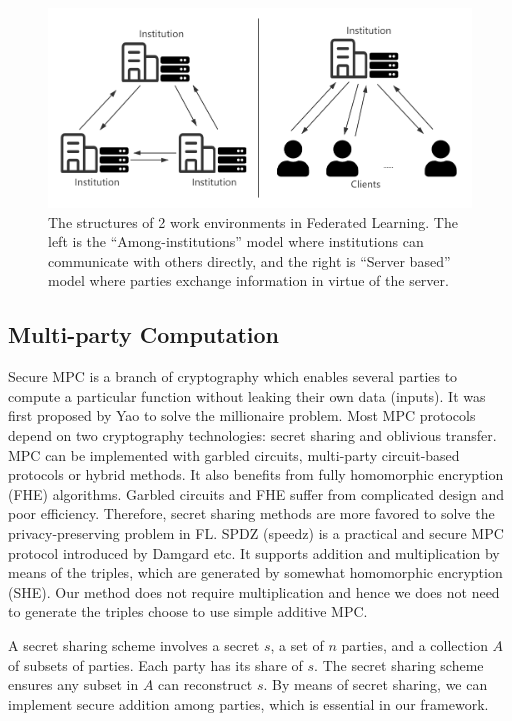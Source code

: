 \begin{figure}[!ht]
    \centering
    \includegraphics[width=\columnwidth]{img/fl_model.png}
    \caption{The structures of 2 work environments in Federated Learning. The left is the ``Among-institutions'' model where institutions can communicate with others directly, and the right is ``Server based'' model where parties exchange information in virtue of the server.}
    \label{fl_model}
\end{figure}


\subsection{Multi-party Computation}
Secure MPC is a branch of cryptography which enables several parties to compute a particular function without leaking their own data (inputs). It was first proposed by Yao to solve the millionaire problem\cite{Yao}. Most MPC protocols depend on two cryptography technologies: secret sharing\cite{Shamir} and oblivious transfer\cite{OT}. MPC can be implemented with garbled circuits, multi-party circuit-based protocols or hybrid methods\cite{mpc-sok}. It also benefits from fully homomorphic encryption (FHE) algorithms. Garbled circuits and FHE suffer from complicated design and poor efficiency. Therefore, secret sharing methods are more favored to solve the privacy-preserving problem in FL. SPDZ\cite{SPDZ} (speedz) is a practical and secure MPC protocol introduced by Damgard etc. It supports addition and multiplication by means of the triples\cite{Triple}, which are generated by somewhat homomorphic encryption (SHE). Our method does not require multiplication and hence we does not need to generate the triples choose to use simple additive MPC.

A secret sharing scheme involves a secret $s$, a set of $n$ parties, and a collection $A$ of subsets of parties. Each party has its share of $s$. The secret sharing scheme ensures any subset in $A$ can reconstruct $s$\cite{Secret-Sharing-survey}. By means of secret sharing, we can implement secure addition among parties, which is essential in our framework.


